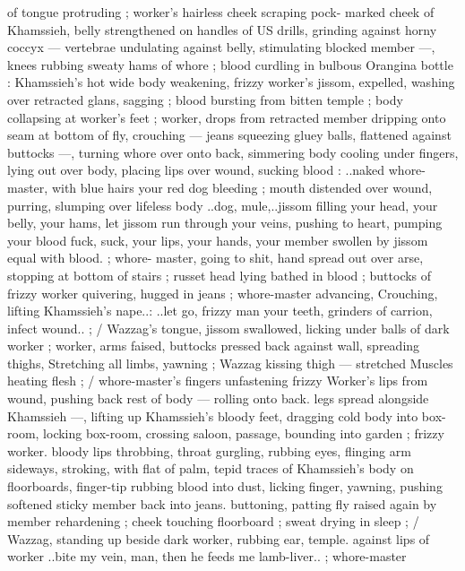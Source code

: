 of tongue protruding ; worker's hairless cheek scraping pock- 
marked cheek of Khamssieh, belly strengthened on handles of US 
drills, grinding against horny coccyx --- vertebrae undulating against 
belly, stimulating blocked member ---, knees rubbing sweaty hams of 
whore ; blood curdling in bulbous Orangina bottle : Khamssieh's hot 
wide body weakening, frizzy worker's jissom, expelled, washing over 
retracted glans, sagging ; blood bursting from bitten temple ; body 
collapsing at worker's feet ; worker, drops from retracted member 
dripping onto seam at bottom of fly, crouching --- jeans squeezing 
gluey balls, flattened against buttocks ---, turning whore over onto 
back, simmering body cooling under fingers, lying out over body, 
placing lips over wound, sucking blood : {\gl}..naked whore-master, with 
blue hairs{\thd} your red dog bleeding{\thd}{\gr} ; mouth distended over wound, 
purring, slumping over lifeless body{\td} {\gl}..dog, mule,..jissom filling 
your head, your belly, your hams, let jissom run through your veins, 
pushing to heart, pumping your blood{\td} fuck, suck, your lips, your 
hands, your member swollen by jissom equal with blood.{\gr} ; whore- 
master, going to shit, hand spread out over arse, stopping at bottom 
of stairs ; russet head lying bathed in blood ; buttocks of frizzy 
worker quivering, hugged in jeans ; whore-master advancing, 
Crouching, lifting Khamssieh's nape..: {\gl}..let go, frizzy man{\thd} your 
teeth, grinders of carrion, infect wound..{\gr} ; {\slash} Wazzag's tongue, 
jissom swallowed, licking under balls of dark worker ; worker, arms 
faised, buttocks pressed back against wall, spreading thighs, 
Stretching all limbs, yawning ; Wazzag kissing thigh --- stretched 
Muscles heating flesh ; {\slash} whore-master's fingers unfastening frizzy 
Worker's lips from wound, pushing back rest of body --- rolling onto 
back. legs spread alongside Khamssieh ---, lifting up Khamssieh's 
bloody feet, dragging cold body into box-room, locking box-room, 
crossing saloon, passage, bounding into garden ; frizzy worker. 
bloody lips throbbing, throat gurgling, rubbing eyes, flinging arm 
sideways, stroking, with flat of palm, tepid traces of Khamssieh's 
body on floorboards, finger-tip rubbing blood into dust, licking 
finger, yawning, pushing softened sticky member back into jeans. 
buttoning, patting fly raised again by member rehardening ; cheek 
touching floorboard ; sweat drying in sleep ; {\slash} Wazzag, standing up 
beside dark worker, rubbing ear, temple. against lips of worker 
{\gl}..bite my vein, man, then he feeds me lamb-liver..{\gr} ; whore-master 
